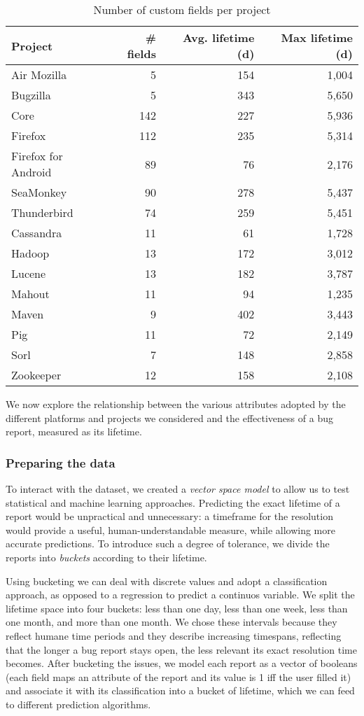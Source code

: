 \begin{table}[ht]
\centering
\caption{Number of custom fields per project}
\begin{tabular}{l|rrr}
\textbf{Project} & \textbf{\# fields} & \textbf{Avg.
lifetime (d)} & \textbf{Max lifetime (d)} \\
 \hline
Air Mozilla & 5 & 154 & 1,004 \\
Bugzilla & 5 & 343 & 5,650 \\
Core & 142 & 227 & 5,936 \\
Firefox & 112 & 235 & 5,314 \\
Firefox for Android & 89 & 76 & 2,176 \\
SeaMonkey & 90 & 278 & 5,437 \\
Thunderbird & 74 & 259 & 5,451 \\
\hline
Cassandra & 11 & 61 & 1,728 \\
Hadoop & 13 & 172 & 3,012 \\
Lucene & 13 & 182 & 3,787 \\
Mahout & 11 & 94 & 1,235 \\
Maven & 9 & 402 & 3,443 \\
Pig & 11 & 72 & 2,149 \\
Sorl & 7 & 148 & 2,858 \\
Zookeeper & 12 & 158 & 2,108 \\
\hline
\end{tabular}
\label{tab:project-fields}
\end{table}


We now explore the relationship between the various attributes adopted by the different platforms and projects we considered and the effectiveness of a bug report, measured as its lifetime.


\subsubsection{Preparing the data} To interact with the dataset, we created a \emph{vector space model} to allow us to test statistical and machine learning approaches.
Predicting the exact lifetime of a report would be unpractical and unnecessary: a timeframe for the resolution would provide a useful, human-understandable measure, while allowing more accurate predictions.
To introduce such a degree of tolerance, we divide the reports into \emph{buckets} according to their lifetime.

 Using bucketing we can deal with discrete values and adopt a classification approach, as opposed to a regression to predict a continuos variable.
We split the lifetime space into four buckets: less than one day, less than one week, less than one month, and more than one month.
We chose these intervals because they reflect humane time periods and they describe increasing timespans, reflecting that the longer a bug report stays open, the less relevant its exact resolution time becomes.
After bucketing the issues, we model each report as a vector of booleans (each field maps an attribute of the report and its value is 1 iff the user filled it) and associate it with its classification into a bucket of lifetime, which we can feed to different prediction algorithms.


